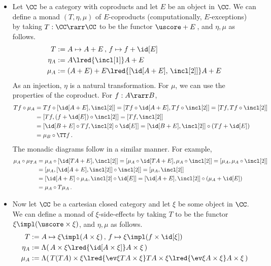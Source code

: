 \documentclass[12pt]{article}
\begin{document}
\begin{itemize}
\item Let $\CC$ be a category with coproducts and let $E$ be an object in $\CC$. We can define a monad $(T,\eta,\mu)$ of $E$-coproducts
    (computationally, $E$-exceptions) by taking $T:\CC\rarr\CC$ to be the functor $\uscore+E$\,, and $\eta,\mu$ as follows.
    \begin{align*}
      T &:= A\mapsto A+E\,,\, f\mapsto f+\id[E] \\
      \eta_A &:= A\lred{\incl[1]}A+E \\
      \mu_A &:=  (A+E)+E\lred{[\id[A+E],\,\incl[2]]}A+E
    \end{align*}
    As an injection, $\eta$ is a natural transformation. For $\mu$, we can use the properties of the coproduct. For $f:A\rarr B$,
   \begin{align*}
     Tf\circ\mu_A &= Tf\circ[\id[A+E],\incl[2]]=[Tf\circ\id[A+E],Tf\circ\incl[2]]=[Tf,Tf\circ\incl[2]] \\
     &= [Tf,(f+\id[E])\circ\incl[2]] = [Tf,\incl[2]] \\
     &= [\id[B+E]\circ Tf,\incl[2]\circ\id[E]]=[\id[B+E],\incl[2]]\circ(Tf+\id[E]) \\
     &= \mu_B\circ\TT f\,.
   \end{align*}
   The monadic diagrams follow in a similar manner. For example,
   \begin{align*}
     \mu_A\circ\mu_{TA} &= \mu_A\circ[\id[TA+E],\incl[2]] = [\mu_A\circ\id[TA+E],\mu_A\circ\incl[2]]=[\mu_A,\mu_A\circ\incl[2]] \\
       &= [\mu_A,[\id[A+E],\incl[2]]\circ\incl[2]] = [\mu_A,\incl[2]] \\
       &= [\id[A+E]\circ\mu_A, \incl[2]\circ\id[E]] = [\id[A+E], \incl[2]]\circ(\mu_A+\id[E]) \\
       &= \mu_A\circ T\mu_A\,.
   \end{align*}
    \item Now let $\CC$ be a cartesian closed category and let $\xi$ be some object in $\CC$. We can define a monad of $\xi$-side-effects by taking
    $T$ to be the functor $\xi\impl(\uscore\times\xi)$, and $\eta,\mu$ as follows.
    \begin{align*}
      T      &:= A\mapsto\xi\impl(A\times\xi)\,,\,f\mapsto\xi\impl(f\times\id[\xi]) \\
      \eta_A &:= \Lambda(\,A\times\xi\lred{\id[A\times\xi]}A\times\xi\,) \\
      \mu_A  &:= \Lambda(\, T(TA)\times\xi \lred{\ev\xi{TA\times\xi}} TA\times\xi\lred{\ev\xi{A\times\xi}}A\times\xi\,)

\end{align*}
\end{itemize}
\end{document}
